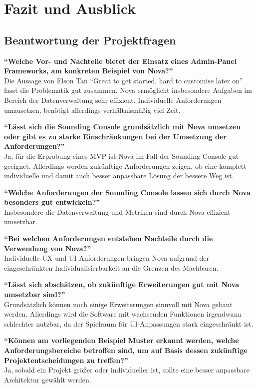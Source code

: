 \section{Fazit und Ausblick}

\subsection{Beantwortung der Projektfragen}

\textbf{\enquote{Welche Vor- und Nachteile bietet der Einsatz eines Admin-Panel Frameworks, am konkreten Beispiel von Nova?}}\\
Die Aussage von Elson Tan \enquote{Great to get started, hard to customise later on}\cite{laravel-nova-in-production-one-year-later} fasst die Problematik gut zusammen.
Nova ermöglicht insbesondere Aufgaben im Bereich der Datenverwaltung sehr effizient.
Individuelle Anforderungen umzusetzen, benötigt allerdings verhältnismäßig viel Zeit.

\textbf{\enquote{Lässt sich die Sounding Console grundsätzlich mit Nova umsetzen oder gibt es zu starke Einschränkungen bei der Umsetzung der Anforderungen?}}\\
Ja, für die Erprobung eines MVP ist Nova im Fall der Sounding Console gut geeignet.
Allerdings werden zukünftige Anforderungen zeigen, ob eine komplett individuelle und damit auch besser anpassbare Lösung der bessere Weg ist.

\textbf{\enquote{Welche Anforderungen der Sounding Console lassen sich durch Nova besonders gut entwickeln?}}\\
Insbesondere die Datenverwaltung und Metriken sind durch Nova effizient umsetzbar.

\textbf{\enquote{Bei welchen Anforderungen entstehen Nachteile durch die Verwendung von Nova?}}\\
Individuelle UX und UI Anforderungen bringen Nova aufgrund der eingeschränkten Individualisierbarkeit an die Grenzen des Machbaren.

\textbf{\enquote{Lässt sich abschätzen, ob zukünftige Erweiterungen gut mit Nova umsetzbar sind?}}\\
Grundsätzlich können noch einige Erweiterungen sinnvoll mit Nova gebaut werden.
Allerdings wird die Software mit wachsenden Funktionen irgendwann schlechter nutzbar, da der Spielraum für UI-Anpassungen stark eingeschränkt ist.

\textbf{\enquote{Können am vorliegenden Beispiel Muster erkannt werden, welche Anforderungsbereiche betroffen sind, um auf Basis dessen zukünftige Projektentscheidungen zu treffen?}}\\
Ja, sobald ein Projekt größer oder individueller ist, sollte eine besser anpassbare Architektur gewählt werden.

